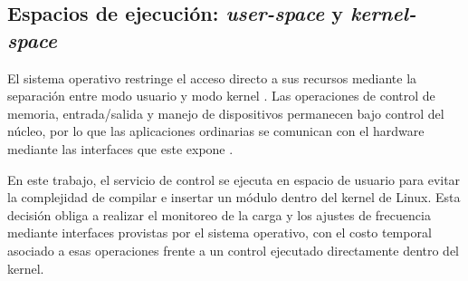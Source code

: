 \subsection{Espacios de ejecución: \textit{user-space} y \textit{kernel-space}}
\label{sec:marco-espacios-ejecucion}

El sistema operativo restringe el acceso directo a sus recursos mediante la
separación entre modo usuario y modo kernel \cite[ch.~2]{Kerrisk2010}. Las
operaciones de control de memoria, entrada/salida y manejo de dispositivos
permanecen bajo control del núcleo, por lo que las aplicaciones ordinarias se
comunican con el hardware mediante las interfaces que este expone
\cite{McCarty2015}.

En este trabajo, el servicio de control se ejecuta en espacio de usuario para
evitar la complejidad de compilar e insertar un módulo dentro del kernel de
Linux. Esta decisión obliga a realizar el monitoreo de la carga y los ajustes
de frecuencia mediante interfaces provistas por el sistema operativo, con el
costo temporal asociado a esas operaciones frente a un control ejecutado
directamente dentro del kernel.

